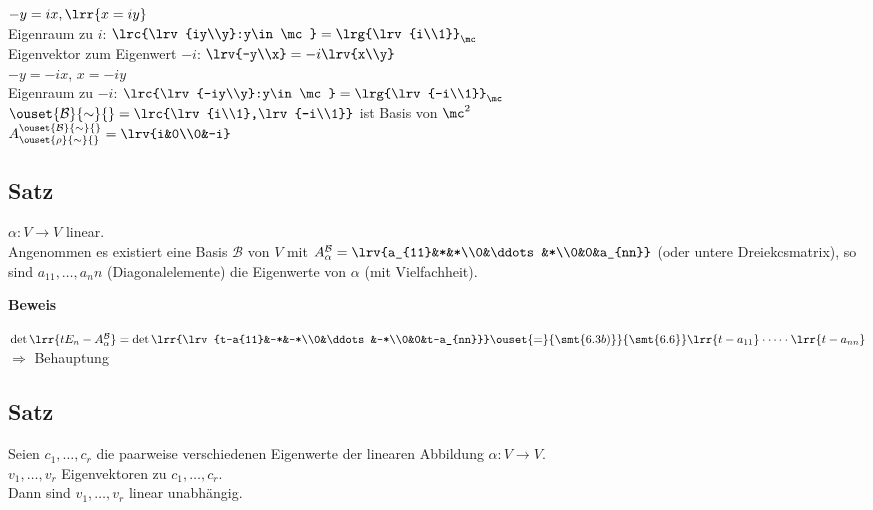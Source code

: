 \begin{enumerate}[a)]
    	  $-y=ix,\lrr{x=iy}$\\
    	  Eigenraum zu $i$: $\lrc{\lrv{iy\\y}:y\in\mc}=\lrg{\lrv{i\\1}}_\mc$\\
    	  Eigenvektor zum Eigenwert $-i$: $\lrv{-y\\x}=-i\lrv{x\\y}$\\
    	  $-y=-ix$, $x=-iy$\\
    	  Eigenraum zu $-i$: $\lrc{\lrv{-iy\\y}:y\in\mc}=\lrg{\lrv{-i\\1}}_\mc$\\
    	  $\ouset{\mathcal{B}}{\sim}{}=\lrc{\lrv{i\\1},\lrv{-i\\1}}$ ist Basis von $\mc^2$\\
    	  $A_{\ouset{\rho}{\sim}{}}^{\ouset{\mathcal{B}}{\sim}{}}=\lrv{i&0\\0&-i}$  
  \end{enumerate}

\subsection{Satz}
	$\alpha:V\rightarrow V$ linear.\\
	Angenommen es existiert eine Basis $\mathcal{B}$ von $V$ mit $A_\alpha^\mathcal{B}=\lrv{a_{11}&*&*\\0&\ddots&*\\0&0&a_{nn}}$ (oder untere Dreiekcsmatrix), so sind $a_{11},\dots,{a_nn}$ (Diagonalelemente) die Eigenwerte von $\alpha$ (mit Vielfachheit).
	
	\textbf{Beweis}
	
	$\det\lrr{tE_n-A_\alpha^{\mathcal{B}}}=\det\lrr{\lrv{t-a{11}&-*&-*\\0&\ddots&-*\\0&0&t-a_{nn}}}\ouset{=}{\smt{6.3b)}}{\smt{6.6}}\lrr{t-a_{11}}\cdot\dots\cdot\lrr{t-a_{nn}}$\\
	$\Rightarrow$ Behauptung

\subsection{Satz}
	Seien $c_1,\dots,c_r$ die paarweise verschiedenen Eigenwerte der linearen Abbildung $\alpha: V\rightarrow V$.\\
	$v_1,\dots,v_r$ Eigenvektoren zu $c_1,\dots,c_r$.\\
	Dann sind $v_1,\dots,v_r$ linear unabhängig.
	
